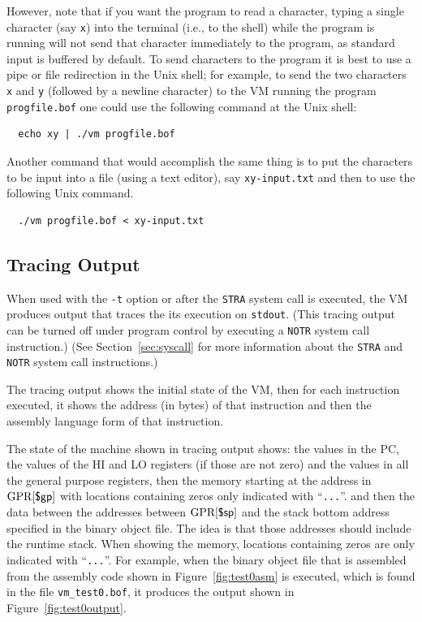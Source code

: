\documentclass[11pt,letterpaper]{article}
\newcommand{\figref}[1]{Figure~\ref{#1}}  %
\newcommand{\secref}[1]{Section~\ref{#1}}  %
\begin{document}
However, note that if you want the program to read a character, typing a single
character (say \texttt{x}) into the terminal (i.e., to the shell) 
while the program is running will not send that character immediately
to the program, as standard input is buffered by default.  To send
characters to the program it is best to use a pipe or file redirection
in the Unix shell; for example, to send the two characters \texttt{x}
and \texttt{y} (followed by a newline character)
to the VM running the program \texttt{progfile.bof} one
could use the following command at the Unix shell:

\begin{lstlisting}
  echo xy | ./vm progfile.bof
\end{lstlisting}

Another command that would accomplish the same thing is to put the
characters to be input into a file (using a text editor), say
\texttt{xy-input.txt} and then to use the following Unix command.

\begin{lstlisting}
  ./vm progfile.bof < xy-input.txt
\end{lstlisting}

\subsection{Tracing Output}

When used with the \texttt{-t} option or after the \texttt{STRA}
system call is executed,
the VM produces output that traces the its execution on \texttt{stdout}.
(This tracing output can be turned off under program control
by executing a \texttt{NOTR} system call instruction.)
(See \secref{sec:syscall} for more information about the \texttt{STRA}
and \texttt{NOTR} system call instructions.)

The tracing output shows the initial state of the VM, then for each
instruction executed, it shows the address (in bytes) of that
instruction and then the assembly language form of that instruction.

The state of the machine shown in tracing output shows:
the values in the PC, the values of the HI and LO registers (if those
are not zero) and the values in all the general purpose registers,
then the memory starting at the address in $\textrm{GPR[}\textsf{\$gp}\textrm{]}$
with locations containing zeros only indicated with ``\texttt{...}''.
and then the data between the addresses between $\textrm{GPR[}\textsf{\$sp}\textrm{]}$ and
the stack bottom address specified in the binary object file.
The idea is that those addresses should include the runtime stack.
When showing the memory, locations containing zeros are only
indicated with ``\texttt{...}''.
For example, when the binary object file that is assembled from the
assembly code shown in \figref{fig:test0asm} is executed,
which is found in the file \texttt{vm\_test0.bof},
it produces the output shown in \figref{fig:test0output}.
\end{document}
